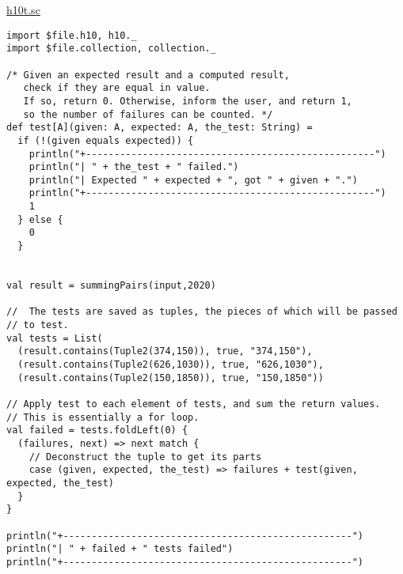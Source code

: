 \documentclass[11pt]{article}
\begin{document}
\href{./testing/h10/h10t.sc}{h10t.sc}
\begin{verbatim}
import $file.h10, h10._
import $file.collection, collection._

/* Given an expected result and a computed result,
   check if they are equal in value.
   If so, return 0. Otherwise, inform the user, and return 1,
   so the number of failures can be counted. */
def test[A](given: A, expected: A, the_test: String) =
  if (!(given equals expected)) {
    println("+---------------------------------------------------")
    println("| " + the_test + " failed.")
    println("| Expected " + expected + ", got " + given + ".")
    println("+---------------------------------------------------")
    1
  } else {
    0
  }


val result = summingPairs(input,2020)

//  The tests are saved as tuples, the pieces of which will be passed
// to test.
val tests = List(
  (result.contains(Tuple2(374,150)), true, "374,150"),
  (result.contains(Tuple2(626,1030)), true, "626,1030"),
  (result.contains(Tuple2(150,1850)), true, "150,1850"))

// Apply test to each element of tests, and sum the return values.
// This is essentially a for loop.
val failed = tests.foldLeft(0) {
  (failures, next) => next match {
    // Deconstruct the tuple to get its parts
    case (given, expected, the_test) => failures + test(given, expected, the_test)
  }
}

println("+---------------------------------------------------")
println("| " + failed + " tests failed")
println("+---------------------------------------------------")
\end{verbatim}
\end{document}
